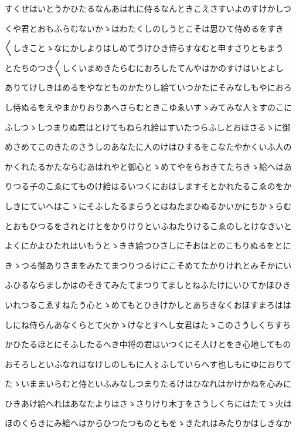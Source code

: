 \documentclass[a4paper,11pt,landscape]{ltjtarticle}
\begin{document}
すくせはいとうかひたるなんあはれに侍るなんときこえさすいよのすけかしつ
\par\medskip
くや君とおもふらむないかゝはわたくしのしうとこそは思ひて侍めるをすき
\par\medskip
〱しきことゝなにかしよりはしめてうけひき侍らすなむと申すさりともまう
\par\medskip
とたちのつき〱しくいまめきたらむにおろしたてんやはかのすけはいとよし
\par\medskip
ありてけしきはめるをやなとものかたりし給ていつかたにそみなしもやにおろ
\par\medskip
し侍ぬるをえやまかりおりあへさらむときこゆゑいすゝみてみな人〻すのこに
\par\medskip
ふしつゝしつまりぬ君はとけてもねられ給はすいたつらふしとおほさるゝに御
\par\medskip
めさめてこのきたのさうしのあなたに人のけはひするをこなたやかくいふ人の
\par\medskip
かくれたるかたならむあはれやと御心とゝめてやをらおきてたちきゝ給へはあ
\par\medskip
りつる子のこゑにてものけ給はるいつくにおはしますそとかれたるこゑのをか
\par\medskip
しきにていへはこゝにそふしたるまらうとはねたまひぬるかいかにちかゝらむ
\par\medskip
とおもひつるをされとけとをかりけりといふねたりけるこゑのしとけなきいと
\par\medskip
よくにかよひたれはいもうとゝきき給つひさしにそおほとのこもりぬるをとに
\par\medskip
きゝつる御ありさまをみたてまつりつるけにこそめてたかりけれとみそかにい
\par\medskip
ふひるならましかはのそきてみたてまつりてましとねふたけにいひてかほひき
\par\medskip
いれつるこゑすねたう心とゝめてもとひきけかしとあちきなくおほすまろはは
\par\medskip
しにね侍らんあなくらとて火かゝけなとすへし女君はたゝこのさうしくちすち
\par\medskip
かひたるほとにそふしたるへき中将の君はいつくにそ人けとをき心地してもの
\par\medskip
おそろしといふなれはなけしのしもに人〻ふしていらへす也しもにゆにおりて
\par\medskip
たゝいままいらむと侍といふみなしつまりたるけはひなれはかけかねを心みに
\par\medskip
ひきあけ給へれはあなたよりはさゝさりけり木丁をさうしくちにはたてゝ火は
\par\medskip
ほのくらきにみ給へはからひつたつものともをゝきたれはみたりかはしきなか
\end{document}

